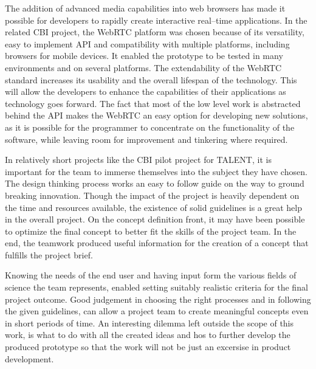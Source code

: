 \documentclass[english,12pt,a4paper,dvips]{article}
\begin{document}
The addition of advanced media capabilities into web browsers has made it possible for developers to rapidly create interactive real--time applications. In the related CBI project, the WebRTC platform was chosen because of its versatility, easy to implement API and compatibility with multiple platforms, including browsers for mobile devices. It enabled the prototype to be tested in many environments and on several platforms. The extendability of the WebRTC standard increases its usability and the overall lifespan of the technology. This will allow the developers to enhance the capabilities of their applications as technology goes forward. The fact that most of the low level work is abstracted behind the API makes the WebRTC an easy option for developing new solutions, as it is possible for the programmer to concentrate on the functionality of the software, while leaving room for improvement and tinkering where required.

In relatively short projects like the CBI pilot project for TALENT, it is important for the team to immerse themselves into the subject they have chosen. The design thinking process works an easy to follow guide on the way to ground breaking innovation. Though the impact of the project is heavily dependent on the time and resources available, the existence of solid guidelines is a great help in the overall project. On the concept definition front, it may have been possible to optimize the final concept to better fit the skills of the project team. In the end, the teamwork produced useful information for the creation of a concept that fulfills the project brief.

Knowing the needs of the end user and having input form the various fields of science the team represents, enabled setting suitably realistic criteria for the final project outcome. Good judgement in choosing the right processes and in following the given guidelines, can allow a project team to create meaningful concepts even in short periods of time. An interesting dilemma left outside the scope of this work, is what to do with all the created ideas and hos to further develop the produced prototype so that the work will not be just an excersise in product development.

\clearpage


\end{document}
